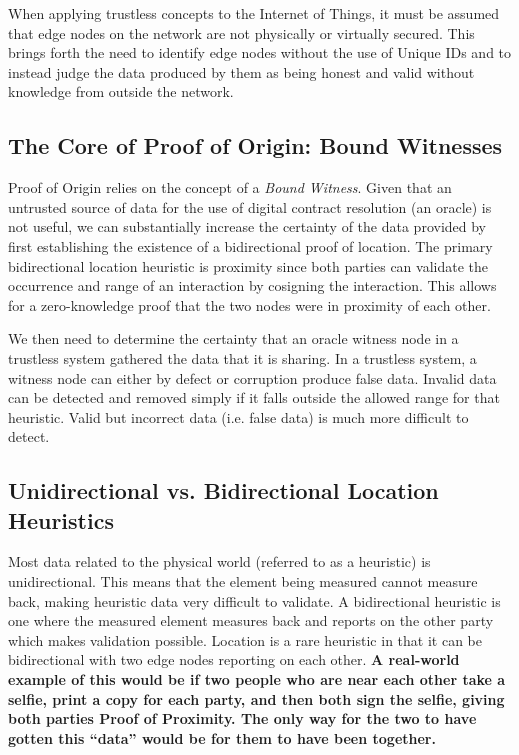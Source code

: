 \documentclass{article}
\begin{document}
When applying trustless concepts to the Internet of Things, it must be assumed that edge nodes on the network are not physically or virtually secured. This brings forth the need to identify edge nodes without the use of Unique IDs and to instead judge the data produced by them as being honest and valid without knowledge from outside the network.

\subsection{The Core of Proof of Origin: Bound Witnesses}

Proof of Origin relies on the concept of a \textit{Bound Witness}. Given that an untrusted source of data for the use of digital contract resolution (an \gls{oracle}) is not useful, we can substantially increase the \gls{certainty} of the data provided by first establishing the existence of a bidirectional proof of location. The primary bidirectional location heuristic is proximity since both parties can validate the occurrence and range of an interaction by cosigning the interaction. This allows for a zero-knowledge proof that the two nodes were in proximity of each other.

We then need to determine the \gls{certainty} that an \gls{oracle} witness node in a trustless system gathered the data that it is sharing. In a trustless system, a witness node can either by defect or corruption produce false data. Invalid data can be detected and removed simply if it falls outside the allowed range for that \gls{heuristic}. Valid but incorrect data (i.e. false data) is much more difficult to detect.

\subsection {Unidirectional vs. Bidirectional Location Heuristics}
Most data related to the physical world (referred to as a heuristic) is unidirectional. This means that the element being measured cannot measure back, making heuristic data very difficult to validate. A bidirectional heuristic is one where the measured element measures back and reports on the other party which makes validation possible. Location is a rare heuristic in that it can be bidirectional with two edge nodes reporting on each other. \textbf{A real-world example of this would be if two people who are near each other take a selfie, print a copy for each party, and then both sign the selfie, giving both parties Proof of Proximity. The only way for the two to have gotten this ``data'' would be for them to have been together.}
\end{document}
